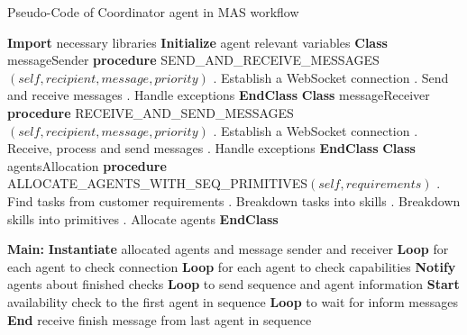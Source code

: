   
\begin{algorithm}
\caption{Pseudo-Code of Coordinator agent in MAS workflow}
\label{alg:CDAPseudoCode}
\begin{algorithmic}
\State \textbf{Import} necessary libraries
\State \textbf{Initialize} agent relevant variables
\State \qquad
\State \textbf{Class} messageSender
    \State \textbf{\qquad procedure} {SEND\_AND\_RECEIVE\_MESSAGES$(self, recipient, message, priority)$}
    \State \qquad {}. Establish a WebSocket connection
    \State \qquad {}. Send and receive messages
    \State \qquad {}. Handle exceptions
\State \textbf{EndClass}
\State \qquad
\State \textbf{Class} messageReceiver
    \State \textbf{\qquad procedure} {RECEIVE\_AND\_SEND\_MESSAGES$(self, recipient, message, priority)$}
    \State \qquad {}. Establish a WebSocket connection
    \State \qquad {}. Receive, process and send messages
    \State \qquad {}. Handle exceptions
\State \textbf{EndClass}
\State \qquad
\State \textbf{Class} agentsAllocation
    \State \textbf{\qquad procedure} {ALLOCATE\_AGENTS\_WITH\_SEQ\_PRIMITIVES$(self, requirements)$}
    \State \qquad {}. Find tasks from customer requirements
    \State \qquad {}. Breakdown tasks into skills
    \State \qquad {}. Breakdown skills into primitives
    \State \qquad {}. Allocate agents
\State \textbf{EndClass}
\State \qquad

\State \textbf{Main:}
\State \textbf{\qquad Instantiate} allocated agents and message sender and receiver
\State \textbf{\qquad Loop} for each agent to check connection
\State \textbf{\qquad Loop} for each agent to check capabilities
\State \textbf{\qquad Notify} agents about finished checks
\State \textbf{\qquad Loop} to send sequence and agent information
\State \textbf{\qquad Start} availability check to the first agent in sequence
\State \textbf{\qquad Loop} to wait for inform messages
\State \textbf{\qquad End} receive finish message from last agent in sequence 
\end{algorithmic}
\end{algorithm}

